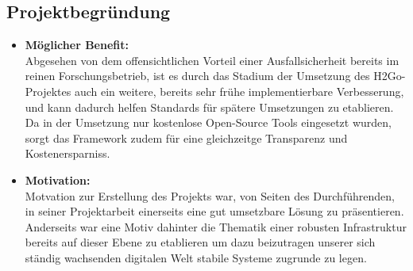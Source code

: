 \subsection{Projektbegründung}\label{sec:Projektbegruendung}
\begin{itemize}
	\item \textbf{Möglicher Benefit:}\\
	Abgesehen von dem offensichtlichen Vorteil einer Ausfallsicherheit bereits im reinen Forschungsbetrieb,
	ist es durch das Stadium der Umsetzung des H2Go-Projektes auch ein weitere, bereits sehr frühe implementierbare Verbesserung, und kann dadurch helfen Standards für spätere Umsetzungen zu 
	etablieren. Da in der Umsetzung nur kostenlose Open-Source Tools eingesetzt wurden, sorgt das Framework zudem für eine gleichzeitge Transparenz und Kostenersparniss.  
	\item \textbf{Motivation:}\\
	Motvation zur Erstellung des Projekts war, von Seiten des Durchführenden, in seiner Projektarbeit einerseits eine gut umsetzbare Lösung zu präsentieren. Anderseits war eine Motiv dahinter die Thematik einer 
	robusten Infrastruktur bereits auf dieser Ebene zu etablieren um dazu beizutragen unserer sich ständig wachsenden digitalen Welt stabile Systeme zugrunde zu legen. 

\end{itemize}


